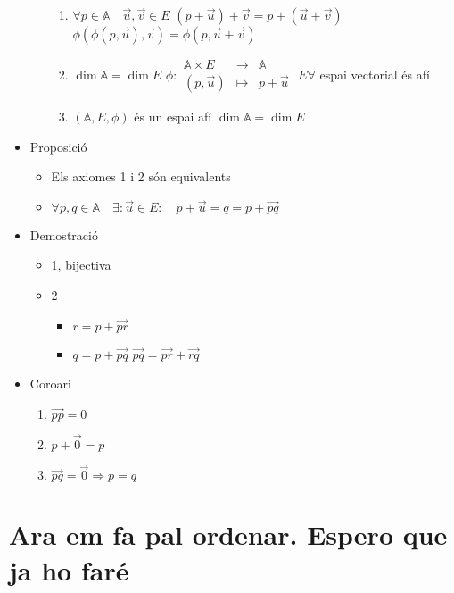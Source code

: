 \documentclass[a4paper,10pt]{article}
\newcommand{\blue}[1]{{\color{blue}#1}}
\newcommand{\A}{\mathbb{A}}
\begin{document}
\begin{itemize}
\begin{itemize}
\begin{enumerate}
		\item $\forall p \in \A \quad \vec{u}, \vec{v} \in E$
			\subitem $(p + \vec{u}) + \vec{v} = p + (\vec{u} + \vec{v})$
			\subitem $\phi (\phi (p, \vec{u}), \vec{v}) = \phi (p, \vec{u} + \vec{v})$
		\item $\dim{\A} = \dim{E}$
			\subitem $\phi: \begin{array}{rcl}\A \times E&\to&\A\\(p,\vec{u})&\mapsto&p+\vec{u}\end{array}$
			\subitem \blue{la suma de} $E \forall$ espai vectorial \blue{és} afí
		\item $(\A, E, \phi)$ \blue{és un} espai afí
			\subitem $\dim{\A} = \dim{E}$
		\end{enumerate}
	\end{itemize}
	\item Proposició
		\begin{itemize}
		\item Els axiomes 1 i 2 són equivalents
		\item $\forall p, q \in \A\quad \exists: \vec{u} \in E:\quad p + \vec{u} = q = p + \overrightarrow{pq}$
		\end{itemize}
	\item Demostració
		\begin{itemize}
		\item 1, bijectiva
		\item 2
			\begin{itemize}
			\item $r = p + \overrightarrow{pr}$
			\item $q = p + \overrightarrow{pq}$
				\subitem $\overrightarrow{pq} = \overrightarrow{pr} + \overrightarrow{rq}$
			\end{itemize}
		\end{itemize}
	\item Coro\lgem ari %
		\begin{enumerate}
		\item $\overrightarrow{pp} = 0$
		\item $p + \vec{0} = p$
		\item $\overrightarrow{pq} = \vec{0} \Rightarrow p = q$
		\end{enumerate}
\end{itemize}

\part{Ara em fa pal ordenar. Espero que ja ho faré}
\end{document}
